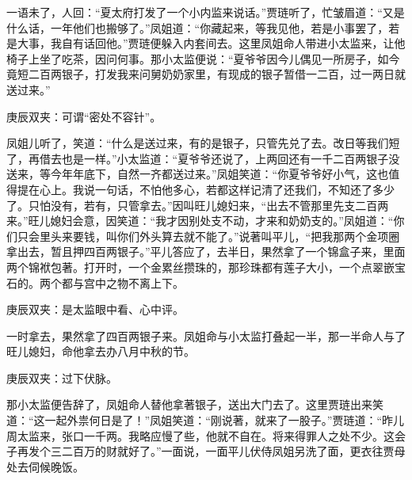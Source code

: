 

\begin{parag}
    一语未了，人回：“夏太府打发了一个小内监来说话。”贾琏听了，忙皱眉道：“又是什么话，一年他们也搬够了。”凤姐道：“你藏起来，等我见他，若是小事罢了，若是大事，我自有话回他。”贾琏便躲入内套间去。这里凤姐命人带进小太监来，让他椅子上坐了吃茶，因问何事。那小太监便说：“夏爷爷因今儿偶见一所房子，如今竟短二百两银子，打发我来问舅奶奶家里，有现成的银子暂借一二百，过一两日就送过来。”\begin{note}庚辰双夹：可谓“密处不容针”。\end{note}凤姐儿听了，笑道：“什么是送过来，有的是银子，只管先兑了去。改日等我们短了，再借去也是一样。”小太监道：“夏爷爷还说了，上两回还有一千二百两银子没送来，等今年年底下，自然一齐都送过来。”凤姐笑道：“你夏爷爷好小气，这也值得提在心上。我说一句话，不怕他多心，若都这样记清了还我们，不知还了多少了。只怕没有，若有，只管拿去。”因叫旺儿媳妇来，“出去不管那里先支二百两来。”旺儿媳妇会意，因笑道：“我才因别处支不动，才来和奶奶支的。”凤姐道：“你们只会里头来要钱，叫你们外头算去就不能了。”说著叫平儿，“把我那两个金项圈拿出去，暂且押四百两银子。”平儿答应了，去半日，果然拿了一个锦盒子来，里面两个锦袱包著。打开时，一个金累丝攒珠的，那珍珠都有莲子大小，一个点翠嵌宝石的。两个都与宫中之物不离上下。\begin{note}庚辰双夹：是太监眼中看、心中评。\end{note}一时拿去，果然拿了四百两银子来。凤姐命与小太监打叠起一半，那一半命人与了旺儿媳妇，命他拿去办八月中秋的节。\begin{note}庚辰双夹：过下伏脉。\end{note}那小太监便告辞了，凤姐命人替他拿著银子，送出大门去了。这里贾琏出来笑道：“这一起外祟何日是了！”凤姐笑道：“刚说著，就来了一股子。”贾琏道：“昨儿周太监来，张口一千两。我略应慢了些，他就不自在。将来得罪人之处不少。这会子再发个三二百万的财就好了。”一面说，一面平儿伏侍凤姐另洗了面，更衣往贾母处去伺候晚饭。
\end{parag}


